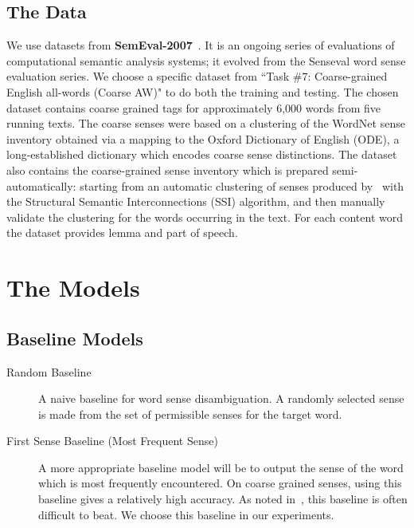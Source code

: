 \documentclass[12pt,letterpaper]{article}
\newcommand{\blue}[1]{\textcolor{RoyalBlue}{#1}}
\newcommand{\instructions}[1]{\blue{\textit{#1}}}
\begin{document}
\subsection{The Data}
\label{sec:data}
We use datasets from \textbf{SemEval-2007}~\cite{semeval}. It is an ongoing series of evaluations of computational semantic analysis systems; it evolved from the Senseval word sense evaluation series. We choose a specific dataset from ``Task \#7: Coarse-grained English all-words (Coarse AW)" to do both the training and testing. The chosen dataset contains coarse grained tags for approximately 6,000 words from five running texts. The coarse senses were based on a clustering of the WordNet sense inventory obtained via a mapping to the Oxford Dictionary of English (ODE), a long-established dictionary which encodes coarse sense distinctions. The dataset also contains the coarse-grained sense inventory which is prepared semi-automatically: starting from an automatic clustering of senses produced by~\cite{Navigli06} with the Structural Semantic Interconnections (SSI) algorithm, and then manually validate the clustering for the words occurring in the text. For each content word the dataset provides lemma and part of speech.

\section{The Models}
\label{sec:models}

\subsection{Baseline Models}
\label{sec:baseline-models}
\begin{description}
\item[Random Baseline] A naive baseline for word sense disambiguation. A randomly selected sense is made from the set of permissible senses for the target word. \\
\item[First Sense Baseline (Most Frequent Sense)] A more appropriate baseline model will be to output the sense of the word which is most frequently encountered. On coarse grained senses, using this baseline gives a relatively high accuracy. As noted in~\cite{navigli2009word}, this baseline is often difficult to beat. We choose this baseline in our experiments.
\end{description}
%
\end{document}
